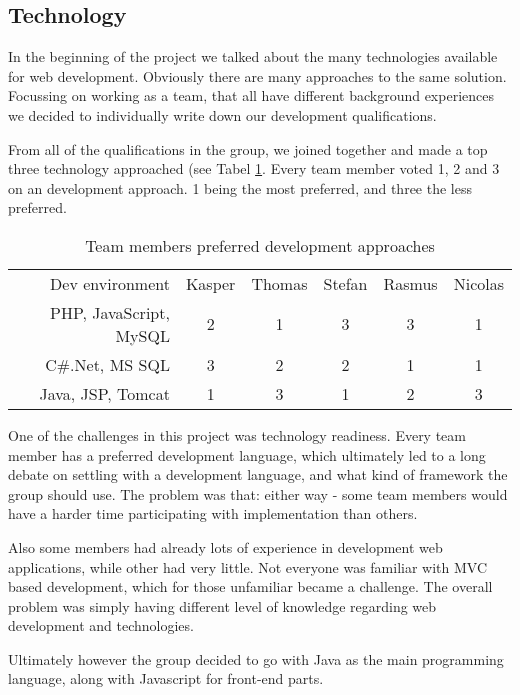 \subsection{Technology}
In the beginning of the project we talked about the many technologies available for web development. Obviously there are many approaches to the same solution. Focussing on working as a team, that all have different background experiences we decided to individually write down our development qualifications.

From all of the qualifications in the group, we joined together and made a top three technology approached (see Tabel \ref{tbl:dev_environment}. Every team member voted 1, 2 and 3 on an development approach. 1 being the most preferred, and three the less preferred. 

\begin{table}[h]
\caption{Team members preferred development approaches}\label{tbl:dev_environment}
    \begin{tabular}{rccccc}
    Dev environment        & Kasper & Thomas & Stefan & Rasmus & Nicolas \\
    PHP, JavaScript, MySQL & 2      & 1      & 3      & 3      & 1       \\
    C\#.Net, MS SQL         & 3      & 2      & 2      & 1      & 1       \\
    Java, JSP, Tomcat      & 1      & 3      & 1      & 2      & 3       \\
    \end{tabular}
\end{table}

One of the challenges in this project was technology readiness. Every team member has a preferred development language, which ultimately led to a long debate on settling with a development language, and what kind of framework the group should use.
The problem was that: either way - some team members would have a harder time participating with implementation than others.

Also some members had already lots of experience in development web applications, while other had very little. Not everyone was familiar with MVC based development, which for those unfamiliar became a challenge. The overall problem was simply having different level of knowledge regarding web development and technologies.

Ultimately however the group decided to go with Java as the main programming language, along with Javascript for front-end parts.


